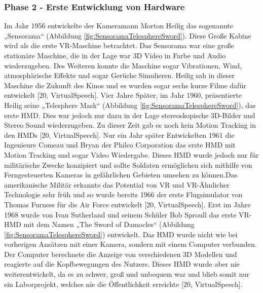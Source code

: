 \subsubsection{Phase 2 - Erste Entwicklung von Hardware}
Im Jahr 1956 entwickelte der Kameramann Morton Heilig das sogenannte „Sensorama“ (Abbildung \ref{fig:SensoramaTelesphereSword}). Diese Große Kabine wird als die erste VR-Maschine betrachtet. Das Sensorama war eine große stationäre Maschine, die in der Lage war 3D Video in Farbe und Audio wiederzugeben. Des Weiteren konnte die Maschine sogar Vibrationen, Wind, atmosphärische Effekte und sogar Gerüche Simulieren. Heilig sah in dieser Maschine die Zukunft des Kinos und es wurden sogar sechs kurze Filme dafür entwickelt [20, VirtualSpeech].
\newline
Vier Jahre Später, im Jahr 1960, präsentierte Heilig seine „Telesphere Mask“ (Abbildung \ref{fig:SensoramaTelesphereSword}), das erste HMD. Dies war jedoch nur dazu in der Lage stereoskopische 3D-Bilder und Stereo Sound wiederzugeben. Zu dieser Zeit gab es noch kein Motion Tracking in den HMDs [20, VirtualSpeech].
\newline
Nur ein Jahr später Entwickelten 1961 die Ingenieure Comeau und Bryan der Philco Corporation das erste HMD mit Motion Tracking und sogar Video Wiedergabe. Dieses HMD wurde jedoch nur für militärische Zwecke konzipiert und sollte Soldaten ermöglichen sich mithilfe von Ferngesteuerten Kameras in gefährlichen Gebieten umsehen zu können.Das amerikanische Militär erkannte das Potential von VR und VR-Ähnlicher Technologie sehr früh und so wurde bereits 1966 der erste Flugsimulator von Thomas Furness für die Air Force entwickelt [20, VirtualSpeech].
\newline
Erst im Jahre 1968 wurde von Ivan Sutherland und seinem Schüler Bob Sproull das erste VR-HMD mit dem Namen „The Sword of Damocles“ (Abbildung \ref{fig:SensoramaTelesphereSword}) entwickelt. Das HMD wurde nicht wie bei vorherigen Ansätzen mit einer Kamera, sondern mit einem Computer verbunden. Der Computer berechnete die Anzeige von verschiedenen 3D Modellen und reagierte auf die Kopfbewegungen des Nutzers. Dieses HMD wurde aber nie weiterentwickelt, da es zu schwer, groß und unbequem war und blieb somit nur ein Laborprojekt, welches nie die Öffentlichkeit erreichte [20, VirtualSpeech].
